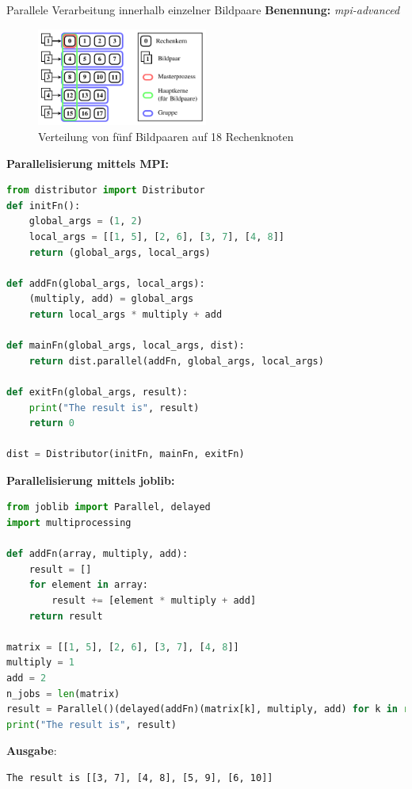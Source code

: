 \begin{frame}{Parallele Verarbeitung innerhalb einzelner Bildpaare}
	\textbf{Benennung:} \textit{mpi-advanced}
	\begin{figure}[h]
		\centering
		\includegraphics[width=0.5\textwidth]{pdf/parallel}
		\caption[Verteilung]{Verteilung von fünf Bildpaaren auf 18 Rechenknoten}
	\end{figure}
	
	\framebreak
	
	\textbf{Parallelisierung mittels MPI:}
	\begin{lstlisting}[language=Python]
from distributor import Distributor
def initFn():
	global_args = (1, 2)
	local_args = [[1, 5], [2, 6], [3, 7], [4, 8]]
	return (global_args, local_args)
	
def addFn(global_args, local_args):
	(multiply, add) = global_args
	return local_args * multiply + add
	
def mainFn(global_args, local_args, dist):
	return dist.parallel(addFn, global_args, local_args)
	
def exitFn(global_args, result):
	print("The result is", result)
	return 0
	
dist = Distributor(initFn, mainFn, exitFn)
	\end{lstlisting}
	
	\framebreak
	
	\textbf{Parallelisierung mittels joblib:}
	\begin{lstlisting}[language=Python]
from joblib import Parallel, delayed
import multiprocessing

def addFn(array, multiply, add):
	result = []
	for element in array:
		result += [element * multiply + add]
	return result
	
matrix = [[1, 5], [2, 6], [3, 7], [4, 8]]
multiply = 1
add = 2
n_jobs = len(matrix)
result = Parallel()(delayed(addFn)(matrix[k], multiply, add) for k in range(n_jobs))
print("The result is", result)
	\end{lstlisting}
	
	\framebreak
	\textbf{
	Ausgabe}:
	\begin{lstlisting}
The result is [[3, 7], [4, 8], [5, 9], [6, 10]]
	\end{lstlisting}
\end{frame}

